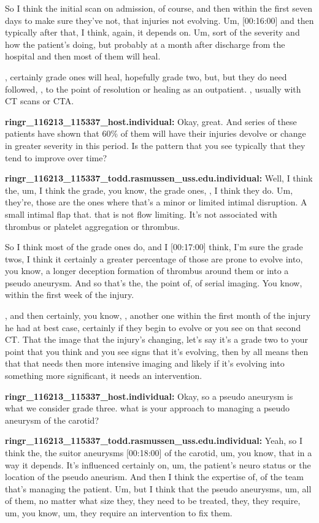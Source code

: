 \documentclass[
]{book}
\begin{document}
So I think the initial scan on admission, of course, and then within the
first seven days to make sure they've not, that injuries not evolving.
Um, {[}00:16:00{]} and then typically after that, I think, again, it depends
on. Um, sort of the severity and how the patient's doing, but probably
at a month after discharge from the hospital and then most of them will
heal.

, certainly grade ones will heal, hopefully grade two, but, but they do
need followed, , to the point of resolution or healing as an outpatient.
, usually with CT scans or CTA.

\textbf{ringr\_116213\_115337\_host.individual:} Okay, great. And series of
these patients have shown that 60\% of them will have their injuries
devolve or change in greater severity in this period. Is the pattern
that you see typically that they tend to improve over time?

\textbf{ringr\_116213\_115337\_todd.rasmussen\_uss.edu.individual:} Well, I think
the, um, I think the grade, you know, the grade ones, , I think they do.
Um, they're, those are the ones where that's a minor or limited intimal
disruption. A small intimal flap that. that is not flow limiting. It's
not associated with thrombus or platelet aggregation or thrombus.

So I think most of the grade ones do, and I {[}00:17:00{]} think, I'm sure
the grade twos, I think it certainly a greater percentage of those are
prone to evolve into, you know, a longer deception formation of thrombus
around them or into a pseudo aneurysm. And so that's the, the point of,
of serial imaging. You know, within the first week of the injury.

, and then certainly, you know, , another one within the first month of
the injury he had at best case, certainly if they begin to evolve or you
see on that second CT. That the image that the injury's changing, let's
say it's a grade two to your point that you think and you see signs that
it's evolving, then by all means then that that needs then more
intensive imaging and likely if it's evolving into something more
significant, it needs an intervention.

\textbf{ringr\_116213\_115337\_host.individual:} Okay, so a pseudo aneurysm is
what we consider grade three. what is your approach to managing a pseudo
aneurysm of the carotid?

\textbf{ringr\_116213\_115337\_todd.rasmussen\_uss.edu.individual:} Yeah, so I
think the, the suitor aneurysms {[}00:18:00{]} of the carotid, um, you know,
that in a way it depends. It's influenced certainly on, um, the
patient's neuro status or the location of the pseudo aneurism. And then
I think the expertise of, of the team that's managing the patient. Um,
but I think that the pseudo aneurysms, um, all of them, no matter what
size they, they need to be treated, they, they require, um, you know,
um, they require an intervention to fix them.
\end{document}

